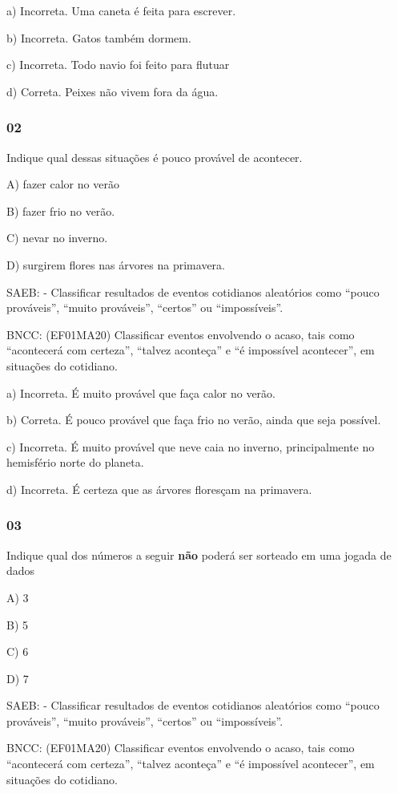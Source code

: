 a) Incorreta. Uma caneta é feita para escrever.

b) Incorreta. Gatos também dormem.

c) Incorreta. Todo navio foi feito para flutuar

d) Correta. Peixes não vivem fora da água.

\subsubsection{02}\label{section-74}

Indique qual dessas situações é pouco provável de acontecer.

A) fazer calor no verão

B) fazer frio no verão.

C) nevar no inverno.

D) surgirem flores nas árvores na primavera.

SAEB: - Classificar resultados de eventos cotidianos aleatórios como
``pouco prováveis'', ``muito prováveis'', ``certos'' ou ``impossíveis''.

BNCC: (EF01MA20) Classificar eventos envolvendo o acaso, tais como
``acontecerá com certeza'', ``talvez aconteça'' e ``é impossível
acontecer'', em situações do cotidiano.

a) Incorreta. É muito provável que faça calor no verão.

b) Correta. É pouco provável que faça frio no verão, ainda que seja
possível.

c) Incorreta. É muito provável que neve caia no inverno, principalmente
no hemisfério norte do planeta.

d) Incorreta. É certeza que as árvores floresçam na primavera.

\subsubsection{03}\label{section-75}

Indique qual dos números a seguir \textbf{não} poderá ser sorteado em
uma jogada de dados

A) 3

B) 5

C) 6

D) 7

\protect\hypertarget{_heading=h.30j0zll}{}{}SAEB: - Classificar
resultados de eventos cotidianos aleatórios como ``pouco prováveis'',
``muito prováveis'', ``certos'' ou ``impossíveis''.

BNCC: (EF01MA20) Classificar eventos envolvendo o acaso, tais como
``acontecerá com certeza'', ``talvez aconteça'' e ``é impossível
acontecer'', em situações do cotidiano.

